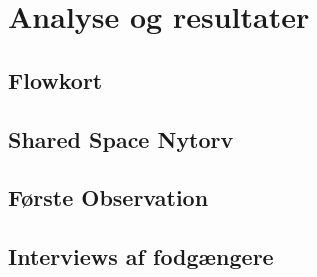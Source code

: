 \chapter{Analyse og resultater}
\label{chap:analyse_og_resultater}

\section{Flowkort}
\label{sec:flowkort}

\section{Shared Space Nytorv}
\label{sec:shared_space_nytorv}

\section{Første Observation}
\label{sec:forste_observation}

\section{Interviews af fodgængere}
\label{sec:interviews_af_fodgaengere}
